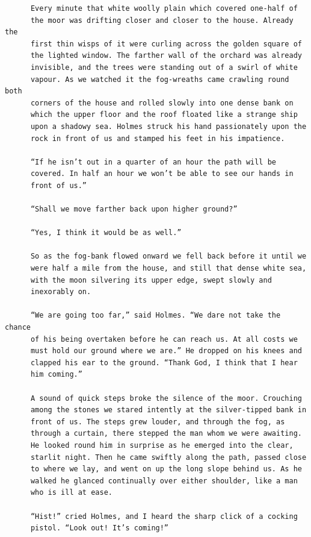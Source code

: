 \documentclass{article}
\begin{document}
\begin{verbatim}
      Every minute that white woolly plain which covered one-half of
      the moor was drifting closer and closer to the house. Already the
      first thin wisps of it were curling across the golden square of
      the lighted window. The farther wall of the orchard was already
      invisible, and the trees were standing out of a swirl of white
      vapour. As we watched it the fog-wreaths came crawling round both
      corners of the house and rolled slowly into one dense bank on
      which the upper floor and the roof floated like a strange ship
      upon a shadowy sea. Holmes struck his hand passionately upon the
      rock in front of us and stamped his feet in his impatience.

      “If he isn’t out in a quarter of an hour the path will be
      covered. In half an hour we won’t be able to see our hands in
      front of us.”

      “Shall we move farther back upon higher ground?”

      “Yes, I think it would be as well.”

      So as the fog-bank flowed onward we fell back before it until we
      were half a mile from the house, and still that dense white sea,
      with the moon silvering its upper edge, swept slowly and
      inexorably on.

      “We are going too far,” said Holmes. “We dare not take the chance
      of his being overtaken before he can reach us. At all costs we
      must hold our ground where we are.” He dropped on his knees and
      clapped his ear to the ground. “Thank God, I think that I hear
      him coming.”

      A sound of quick steps broke the silence of the moor. Crouching
      among the stones we stared intently at the silver-tipped bank in
      front of us. The steps grew louder, and through the fog, as
      through a curtain, there stepped the man whom we were awaiting.
      He looked round him in surprise as he emerged into the clear,
      starlit night. Then he came swiftly along the path, passed close
      to where we lay, and went on up the long slope behind us. As he
      walked he glanced continually over either shoulder, like a man
      who is ill at ease.

      “Hist!” cried Holmes, and I heard the sharp click of a cocking
      pistol. “Look out! It’s coming!”


\end{verbatim}
\end{document}
